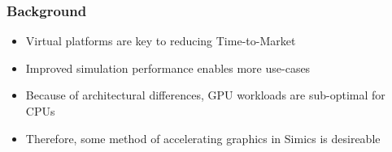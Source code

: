 \begin{frame}
\frametitle{Background}

\begin{itemize}
\item Virtual platforms are key to reducing Time-to-Market
\item Improved simulation performance enables more use-cases
\item Because of architectural differences, GPU workloads are sub-optimal for CPUs
\item Therefore, some method of accelerating graphics in Simics is desireable
\end{itemize}

\end{frame}

